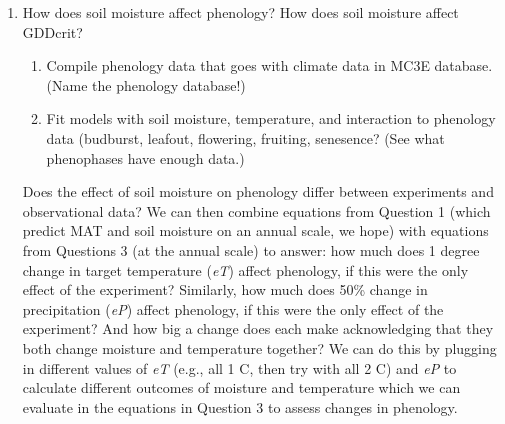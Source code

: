 \documentclass{article}
\begin{document}
\begin{enumerate}
\item{How does soil moisture affect phenology? How does soil moisture affect GDDcrit?}
\begin{enumerate}
\item{Compile phenology data that goes with climate data in MC3E database. (Name the phenology database!)}
\item{Fit models with soil moisture, temperature, and interaction to phenology data (budburst, leafout, flowering, fruiting, senesence? (See what phenophases have enough data.)}
\end{enumerate}
\noindent Does the effect of soil moisture on phenology differ between experiments and observational data? We can then combine equations from Question 1 (which predict MAT and soil moisture on an annual scale, we hope) with equations from Questions 3 (at the annual scale) to answer: how much does 1 degree change in target temperature (\textit{eT}) affect phenology, if this were the only effect of the experiment? Similarly, how much does 50\% change in precipitation (\textit{eP}) affect phenology, if this were the only effect of the experiment? And how big a change does each make acknowledging that they both change moisture and temperature together? We can do this by plugging in different values of \textit{eT} (e.g., all 1 C, then try with all 2 C) and \textit{eP} to calculate different outcomes of moisture and temperature which we can evaluate in the equations in Question 3 to assess changes in phenology.
\end{enumerate}



\end{document}
